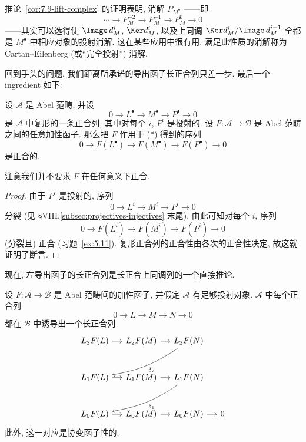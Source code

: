 \begin{remark}\label{rmk:7.10-cartan-eilenberg}
推论~\ref{cor:7.9-lift-complex} 的证明表明, 消解 $P_{M^\bullet}$ ——即
\[
\cdots\to P_{M}^{-2}\to P_{M}^{-1}\to P_{M}^{0}\to 0
\]
——其实可以选得使 $\Image\,d_M^i$, $\Ker d_M^i$, 以及上同调 $\Ker d_M^i/\Image\,d_M^{i-1}$ 全都是 $M^\bullet$ 中相应对象的投射消解. 这在某些应用中很有用. 满足此性质的消解称为 Cartan--Eilenberg (或``完全投射'') 消解.
\end{remark}

回到手头的问题, 我们距离所承诺的导出函子长正合列只差一步. 最后一个 ingredient 如下:

\begin{lemma}\label{lem:7.11-projective-exact}
设 $\mathcal{A}$ 是 Abel 范畴, 并设
\begin{equation*}
0\to L^\bullet\to M^\bullet\to P^\bullet\to 0\tag{*}
\end{equation*}
是 $\mathcal{A}$ 中复形的一条正合列, 其中对每个 $i$, $P^i$ 是投射的. 设 $F:\mathcal{A}\to\mathcal{B}$ 是 Abel 范畴之间的任意加性函子. 那么把 $F$ 作用于 (*) 得到的序列
\[
0\to F(L^\bullet)\to F(M^\bullet)\to F(P^\bullet)\to 0
\]
是正合的.

注意我们并不要求 $F$ 在任何意义下正合.
\end{lemma}

\begin{proof}
由于 $P^i$ 是投射的, 序列
\[
0\to L^i\to M^i\to P^i\to 0
\]
分裂 (见 §VIII.\ref{subsec:projectives-injectives} 末尾). 由此可知对每个 $i$, 序列
\[
0\to F(L^i)\to F(M^i)\to F(P^i)\to 0
\]
(分裂且) 正合 (习题~\ref{ex:5.11}). 复形正合列的正合性由各次的正合性决定, 故这就证明了断言.
\end{proof}

现在, 左导出函子的长正合列是长正合上同调列的一个直接推论.

\begin{theorem}\label{thm:7.12-les}
设 $F:\mathcal{A}\to\mathcal{B}$ 是 Abel 范畴间的加性函子, 并假定 $\mathcal{A}$ 有足够投射对象. $\mathcal{A}$ 中每个正合列
\[
0\to L\to M\to N\to 0
\]
都在 $\mathcal{B}$ 中诱导出一个长正合列
\[
\begin{tikzcd}[ampersand replacement=\&,column sep=small,row sep=large]
L_2F(L)\ar[r]\&L_2F(M)\ar[r]\&L_2F(N)\ar[dll,bend left=12,"\delta_2"]\\
L_1F(L)\ar[r]\&L_1F(M)\ar[r]\&L_1F(N)\ar[dll,bend left=12,"\delta_1"]\\
L_0F(L)\ar[r]\&L_0F(M)\ar[r]\&L_0F(N)\ar[r]\&0
\end{tikzcd}
\]
此外, 这一对应是协变函子性的.
\end{theorem}

